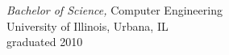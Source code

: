 \begin{samepage}
{\sl Bachelor of Science,} Computer Engineering \\
University of Illinois, Urbana, IL\\
graduated 2010
\end{samepage}
